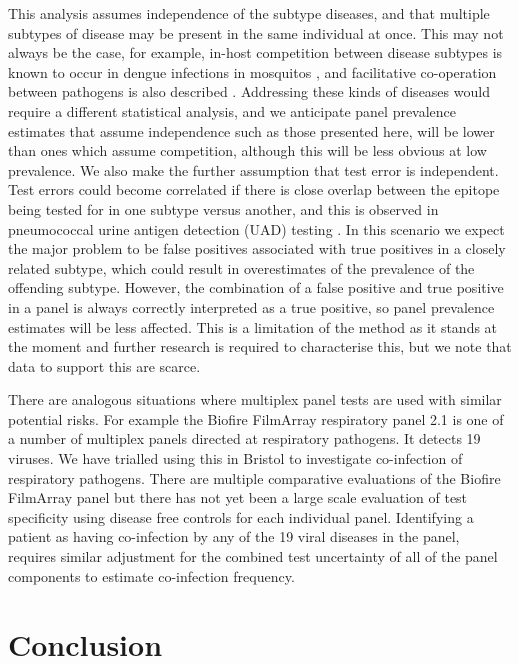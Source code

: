 \documentclass[10pt,letterpaper]{article}
\begin{document}
This analysis assumes independence of the subtype diseases, and that multiple subtypes of disease may be present in the same individual at once. This may not always be the case, for example, in-host competition between disease subtypes is known to occur in dengue infections in mosquitos \cite{pepin2008}, and facilitative co-operation between pathogens is also described \cite{singer2010}. Addressing these kinds of diseases would require a different statistical analysis, and we anticipate panel prevalence estimates that assume independence such as those presented here, will be lower than ones which assume competition, although this will be less obvious at low prevalence. We also make the further assumption that test error is independent. Test errors could become correlated if there is close overlap between the epitope being tested for in one subtype versus another, and this is observed in pneumococcal urine antigen detection (UAD) testing \cite{bonten2015}. In this scenario we expect the major problem to be false positives associated with true positives in a closely related subtype, which could result in overestimates of the prevalence of the offending subtype. However, the combination of a false positive and true positive in a panel is always correctly interpreted as a true positive, so panel prevalence estimates will be less affected. This is a limitation of the method as it stands at the moment and further research is required to characterise this, but we note that data to support this are scarce.

There are analogous situations where multiplex panel tests are used with similar potential risks. For example the Biofire FilmArray respiratory panel 2.1 is one of a number of multiplex panels directed at respiratory pathogens\cite{ramanan2017}. It detects 19 viruses\cite{chang2022,loeffelholz2020}. We have trialled using this in Bristol to investigate co-infection of respiratory pathogens. There are multiple comparative evaluations of the Biofire FilmArray panel\cite{popowitch2020,murphy2020,loeffelholz2020,leber2018,babady2013,chan2018} but there has not yet been a large scale evaluation of test specificity using disease free controls for each individual panel. Identifying a patient as having co-infection by any of the 19 viral diseases in the panel, requires similar adjustment for the combined test uncertainty of all of the panel components to estimate co-infection frequency.

\section*{Conclusion}
\end{document}
